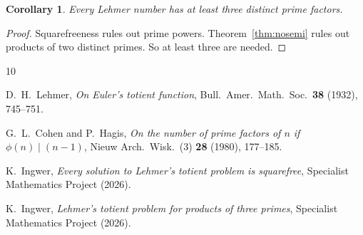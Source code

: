 \documentclass[12pt,a4paper]{amsart}
\newtheorem{corollary}[theorem]{Corollary}
\theoremstyle{definition}
\begin{document}
\begin{corollary}
Every Lehmer number has at least three distinct prime factors.
\end{corollary}

\begin{proof}
Squarefreeness \cite{Ingwer2026sqfree} rules out prime powers.
Theorem~\ref{thm:nosemi} rules out products of two distinct primes.
So at least three are needed.
\end{proof}

\begin{thebibliography}{10}

D.~H.~Lehmer,
\emph{On Euler's totient function},
Bull.\ Amer.\ Math.\ Soc.\ \textbf{38} (1932), 745--751.

G.~L.~Cohen and P.~Hagis,
\emph{On the number of prime factors of $n$ if $\phi(n) \mid (n-1)$},
Nieuw Arch.\ Wisk.\ (3) \textbf{28} (1980), 177--185.

K.~Ingwer,
\emph{Every solution to Lehmer's totient problem is squarefree},
Specialist Mathematics Project (2026).

K.~Ingwer,
\emph{Lehmer's totient problem for products of three primes},
Specialist Mathematics Project (2026).

\end{thebibliography}
\end{document}
